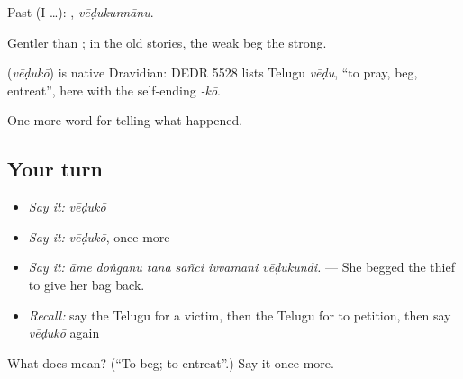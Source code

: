 Past (I …): , \emph{vēḍukunnānu}.

Gentler than ; in the old stories, the weak beg the strong.

\begin{cousinweb}
\textbf{} (\emph{vēḍukō}) is native Dravidian: DEDR 5528 lists Telugu \emph{vēḍu}, \textquotedblleft{}to pray, beg, entreat\textquotedblright{}, here with the self-ending \emph{-kō}.
\end{cousinweb}

\begin{grammarlens}[title={What you've built}]
One more word for telling what happened.
\end{grammarlens}

\subsection*{Your turn}
\begin{itemize}
\raggedright
  \item \emph{Say it:} \emph{vēḍukō}
  \item \emph{Say it:} \emph{vēḍukō}, once more
  \item \emph{Say it:} \emph{āme doṅganu tana sañci ivvamani vēḍukundi.} — She begged the thief to give her bag back.
  \item \emph{Recall:} say the Telugu for a victim, then the Telugu for to petition, then say \emph{vēḍukō} again
\end{itemize}

\begin{tcolorbox}[breakable,colback=teal!4,colframe=teal!35!black,title={Before you move on}]
What does  mean? (\textquotedblleft{}To beg; to entreat\textquotedblright{}.) Say it once more.
\end{tcolorbox}
